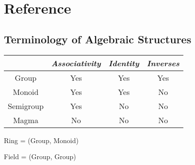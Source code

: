 \documentclass[11pt,a4paper]{article}
\begin{document}
\section{Reference}

\subsection{Terminology of Algebraic Structures}

\begin{tabular}{cccc}
    \toprule
              & \emph{Associativity} & \emph{Identity} & \emph{Inverses} \\
    \midrule
    Group     & Yes                  & Yes             & Yes \\
    Monoid    & Yes                  & Yes             & No  \\
    Semigroup & Yes                  & No              & No  \\
    Magma     & No                   & No              & No  \\
    \bottomrule
\end{tabular}

Ring  = (Group, Monoid)

Field = (Group, Group)
\end{document}
